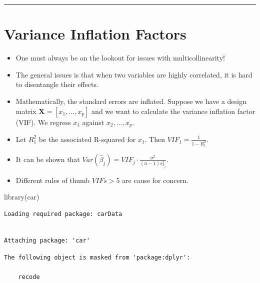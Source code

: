 \documentclass[
  letterpaper,
  DIV=11,
  numbers=noendperiod]{scrreprt}
\newenvironment{Shaded}{\begin{snugshade}}{\end{snugshade}}
\newcommand{\FunctionTok}[1]{\textcolor[rgb]{0.28,0.35,0.67}{#1}}
\newcommand{\NormalTok}[1]{\textcolor[rgb]{0.00,0.23,0.31}{#1}}
\begin{document}
\begin{center}\rule{0.5\linewidth}{0.5pt}\end{center}

\hypertarget{variance-inflation-factors}{%
\section*{Variance Inflation Factors}\label{variance-inflation-factors}}


\begin{itemize}
\item
  One must always be on the lookout for issues with multicollinearity!
\item
  The general issues is that when two variables are highly correlated,
  it is hard to disentangle their effects.
\item
  Mathematically, the standard errors are inflated. Suppose we have a
  design matrix \(\mathbf{X} = [x_1, ..., x_p]\) and we want to
  calculate the variance inflation factor (VIF). We regress \(x_1\)
  against \(x_2, ..., x_p\).
\item
  Let \(R_1^2\) be the associated R-squared for \(x_1\). Then
  \(VIF_1 = \frac{1}{1-R_1^2}\).
\item
  It can be shown that
  \(Var(\hat{\beta}_j) = VIF_j \cdot \frac{\sigma^2}{(n-1)s_{x_j}^2}\).
\item
  Different rules of thumb \(VIFs>5\) are cause for concern.
\end{itemize}

\begin{Shaded}
\begin{Highlighting}[]
\FunctionTok{library}\NormalTok{(car)}
\end{Highlighting}
\end{Shaded}

\begin{verbatim}
Loading required package: carData
\end{verbatim}

\begin{verbatim}

Attaching package: 'car'
\end{verbatim}

\begin{verbatim}
The following object is masked from 'package:dplyr':

    recode
\end{verbatim}
\end{document}
